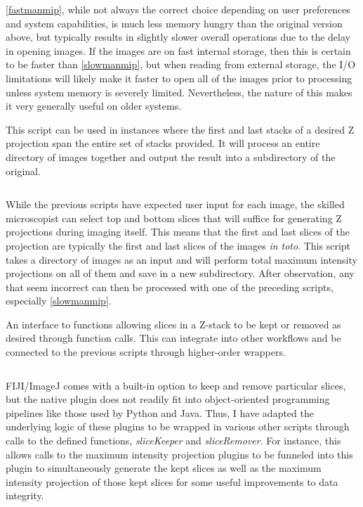 \autoref{fastmanmip}, while not always the correct choice depending on user preferences and system capabilities, is much less memory hungry than the original version above, but typically results in slightly slower overall operations due to the delay in opening images. If the images are on fast internal storage, then this is certain to be faster than \autoref{slowmanmip}, but when reading from external storage, the I/O limitations will likely make it faster to open all of the images prior to processing unless system memory is severely limited. Nevertheless, the nature of this makes it very generally useful on older systems.

\begin{code}
\caption{This script can be used in instances where the first and last stacks of a desired Z projection span the entire set of stacks provided. It will process an entire directory of images together and output the result into a subdirectory of the original.}
\label{bulkmip}

\inputminted[breaklines,frame=single,fontsize=\small]{python}{source/bulkMIPper.py}

\end{code}

While the previous scripts have expected user input for each image, the skilled microscopist can select top and bottom slices that will suffice for generating Z projections during imaging itself. This means that the first and last slices of the projection are typically the first and last slices of the images \textit{in toto}. This script takes a directory of images as an input and will perform total maximum intensity projections on all of them and save in a new subdirectory. After observation, any that seem incorrect can then be processed with one of the preceding scripts, especially \autoref{slowmanmip}. 

\begin{code}
\caption{An interface to functions allowing slices in a Z-stack to be kept or removed as desired through function calls. This can integrate into other workflows and be connected to the previous scripts through higher-order wrappers.}
\label{reslicer}

\inputminted[breaklines,frame=single,fontsize=\small]{python}{source/reSlicer.py}

\end{code}

FIJI/ImageJ comes with a built-in option to keep and remove particular slices, but the native plugin does not readily fit into object-oriented programming pipelines like those used by Python and Java. Thus, I have adapted the underlying logic of these plugins to be wrapped in various other scripts through calls to the defined functions, \textit{sliceKeeper} and \textit{sliceRemover}. For instance, this allows calls to the maximum intensity projection plugins to be funneled into this plugin to simultaneously generate the kept slices as well as the maximum intensity projection of those kept slices for some useful improvements to data integrity. 

